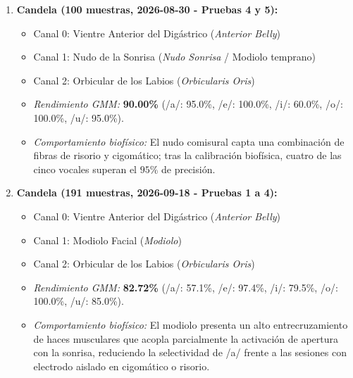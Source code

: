 \documentclass[11pt,a4paper,openany]{book}
\theoremstyle{definition}
\begin{document}
\begin{enumerate}
    \item \textbf{Candela (100 muestras, 2026-08-30 - Pruebas 4 y 5):}
    \begin{itemize}
        \item Canal 0: Vientre Anterior del Digástrico (\textit{Anterior Belly})
        \item Canal 1: Nudo de la Sonrisa (\textit{Nudo Sonrisa} / Modiolo temprano)
        \item Canal 2: Orbicular de los Labios (\textit{Orbicularis Oris})
        \item \textit{Rendimiento GMM:} \textbf{90.00\%} (/a/: 95.0\%, /e/: 100.0\%, /i/: 60.0\%, /o/: 100.0\%, /u/: 95.0\%).
        \item \textit{Comportamiento biofísico:} El nudo comisural capta una combinación de fibras de risorio y cigomático; tras la calibración biofísica, cuatro de las cinco vocales superan el $95\%$ de precisión.
    \end{itemize}

    \item \textbf{Candela (191 muestras, 2026-09-18 - Pruebas 1 a 4):}
    \begin{itemize}
        \item Canal 0: Vientre Anterior del Digástrico (\textit{Anterior Belly})
        \item Canal 1: Modiolo Facial (\textit{Modiolo})
        \item Canal 2: Orbicular de los Labios (\textit{Orbicularis Oris})
        \item \textit{Rendimiento GMM:} \textbf{82.72\%} (/a/: 57.1\%, /e/: 97.4\%, /i/: 79.5\%, /o/: 100.0\%, /u/: 85.0\%).
        \item \textit{Comportamiento biofísico:} El modiolo presenta un alto entrecruzamiento de haces musculares que acopla parcialmente la activación de apertura con la sonrisa, reduciendo la selectividad de /a/ frente a las sesiones con electrodo aislado en cigomático o risorio.
    \end{itemize}


\end{enumerate}
\end{document}
